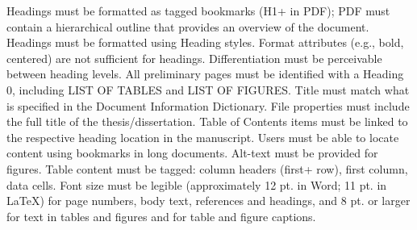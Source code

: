 \thesisrequiretagging


	{Headings must be formatted as tagged bookmarks (H1+ in PDF); PDF must
	 contain a hierarchical outline that provides an overview of the document.
	 Headings must be formatted using Heading styles. Format attributes (e.g.,
	 bold, centered) are not sufficient for headings.}
	{Differentiation must be perceivable between heading levels. All
	 preliminary pages must be identified with a Heading 0, including LIST OF
	 TABLES and LIST OF FIGURES.}
	{Title must match what is specified in the Document Information Dictionary.
	 File properties must include the full title of the thesis/dissertation.}
	{Table of Contents items must be linked to the respective heading location
	 in the manuscript. Users must be able to locate content using bookmarks in
	 long documents.}
	{Alt-text must be provided for figures.}
	{Table content must be tagged: column headers (first+ row), first column,
	 data cells.}
	{Font size must be legible (approximately 12 pt. in Word; 11 pt. in LaTeX)
	 for page numbers, body text, references and headings, and 8 pt. or larger
	 for text in tables and figures and for table and figure captions.}

